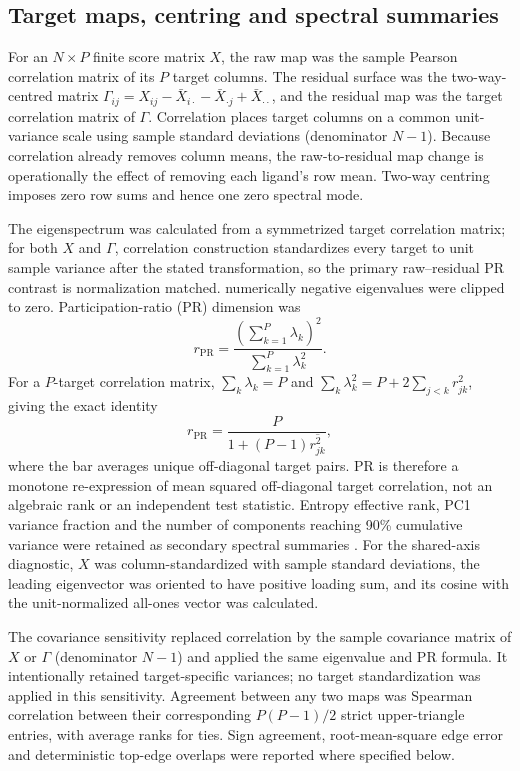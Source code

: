 \subsection{Target maps, centring and spectral summaries}

For an $N\times P$ finite score matrix $X$, the raw map was the sample Pearson
correlation matrix of its $P$ target columns.  The residual surface was the
two-way-centred matrix
$\Gamma_{ij}=X_{ij}-\bar X_{i\cdot}-\bar X_{\cdot j}+\bar X_{\cdot\cdot}$, and
the residual map was the target correlation matrix of $\Gamma$.  Correlation
places target columns on a common unit-variance scale using sample standard
deviations (denominator $N-1$).  Because correlation already removes column
means, the raw-to-residual map change is operationally the effect of removing
each ligand's row mean.  Two-way centring imposes zero row sums and hence one
zero spectral mode.

The eigenspectrum was calculated from a symmetrized target correlation matrix;
for both $X$ and $\Gamma$, correlation construction standardizes every target
to unit sample variance after the stated transformation, so the primary
raw--residual PR contrast is normalization matched.
numerically negative eigenvalues were clipped to zero.  Participation-ratio
(PR) dimension was
\[
 r_{\mathrm{PR}}=\frac{(\sum_{k=1}^{P}\lambda_k)^2}
 {\sum_{k=1}^{P}\lambda_k^2}.
\]
For a $P$-target correlation matrix, $\sum_k\lambda_k=P$ and
$\sum_k\lambda_k^2=P+2\sum_{j<k}r_{jk}^2$, giving the exact identity
\[
r_{\mathrm{PR}}=\frac{P}{1+(P-1)\overline{r_{jk}^{2}}},
\]
where the bar averages unique off-diagonal target pairs.  PR is therefore a
monotone re-expression of mean squared off-diagonal target correlation, not an
algebraic rank or an independent test statistic.  Entropy effective rank, PC1
variance fraction and the number of
components reaching 90\% cumulative variance were retained as secondary
spectral summaries \cite{mazzucato2016,roy2007}.  For the shared-axis diagnostic,
$X$ was column-standardized with sample standard deviations, the leading
eigenvector was oriented to have positive loading sum, and its cosine with the
unit-normalized all-ones vector was calculated.

The covariance sensitivity replaced correlation by the sample covariance
matrix of $X$ or $\Gamma$ (denominator $N-1$) and applied the same eigenvalue and
PR formula.  It intentionally retained target-specific variances; no target
standardization was applied in this sensitivity.  Agreement between any two
maps was Spearman correlation between their corresponding $P(P-1)/2$ strict
upper-triangle entries, with average ranks for ties.  Sign agreement,
root-mean-square edge error and
deterministic top-edge overlaps were reported where specified below.

